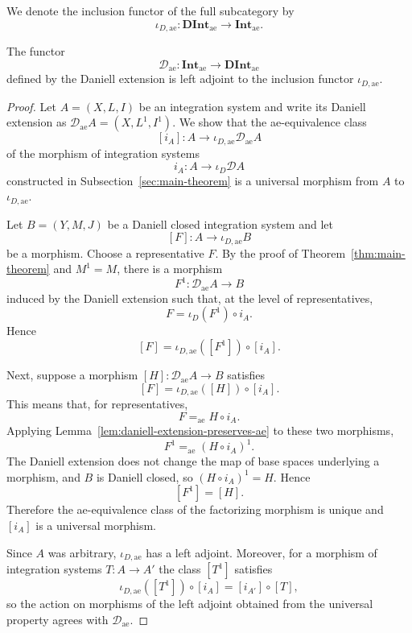 \begin{definition}
  We denote the inclusion functor of the full subcategory by
  \[
    \iota_{D,\mathrm{ae}}:
    \mathbf{DInt}_{\mathrm{ae}}
    \to
    \mathbf{Int}_{\mathrm{ae}} .
  \]
\end{definition}

\begin{theorem}\label{thm:main-ae}
  The functor
  \[
    \mathcal{D}_{\mathrm{ae}}:
    \mathbf{Int}_{\mathrm{ae}}
    \to
    \mathbf{DInt}_{\mathrm{ae}}
  \]
  defined by the Daniell extension is left adjoint to the inclusion functor
  $\iota_{D,\mathrm{ae}}$.
\end{theorem}
\begin{proof}
  Let $A=(X,L,I)$ be an integration system and write its Daniell extension as
  $\mathcal{D}_{\mathrm{ae}}A=(X,L^1,I^1)$.
  We show that the ae-equivalence class
  \[
    [i_A]:A\to\iota_{D,\mathrm{ae}}\mathcal{D}_{\mathrm{ae}}A
  \]
  of the morphism of integration systems
  \[
    i_A:A\to\iota_{D}\mathcal{D}A
  \]
  constructed in Subsection~\ref{sec:main-theorem} is a universal morphism from
  $A$ to $\iota_{D,\mathrm{ae}}$.

  Let $B=(Y,M,J)$ be a Daniell closed integration system and let
  \[
    [F]:A\to\iota_{D,\mathrm{ae}}B
  \]
  be a morphism. Choose a representative $F$. By the proof of
  Theorem~\ref{thm:main-theorem} and $M^1=M$, there is a morphism
  \[
    F^1:\mathcal{D}_{\mathrm{ae}}A\to B
  \]
  induced by the Daniell extension such that, at the level of representatives,
  \[
    F=\iota_{D}(F^1)\circ i_A .
  \]
  Hence
  \[
    [F]=\iota_{D,\mathrm{ae}}([F^1])\circ[i_A].
  \]

  Next, suppose a morphism $[H]:\mathcal{D}_{\mathrm{ae}}A\to B$ satisfies
  \[
    [F]=\iota_{D,\mathrm{ae}}([H])\circ[i_A] .
  \]
  This means that, for representatives,
  \[
    F=_{\mathrm{ae}}H\circ i_A .
  \]
  Applying Lemma~\ref{lem:daniell-extension-preserves-ae} to these two
  morphisms,
  \[
    F^1=_{\mathrm{ae}}(H\circ i_A)^1 .
  \]
  The Daniell extension does not change the map of base spaces underlying a
  morphism, and $B$ is Daniell closed, so $(H\circ i_A)^1=H$. Hence
  \[
    [F^1]=[H].
  \]
  Therefore the ae-equivalence class of the factorizing morphism is unique and
  $[i_A]$ is a universal morphism.

  Since $A$ was arbitrary, $\iota_{D,\mathrm{ae}}$ has a left adjoint.
  Moreover, for a morphism of integration systems $T:A\to A'$ the class $[T^1]$
  satisfies
  \[
    \iota_{D,\mathrm{ae}}([T^1])\circ[i_A]
    =[i_{A'}]\circ[T] ,
  \]
  so the action on morphisms of the left adjoint obtained from the universal
  property agrees with $\mathcal{D}_{\mathrm{ae}}$.
\end{proof}


